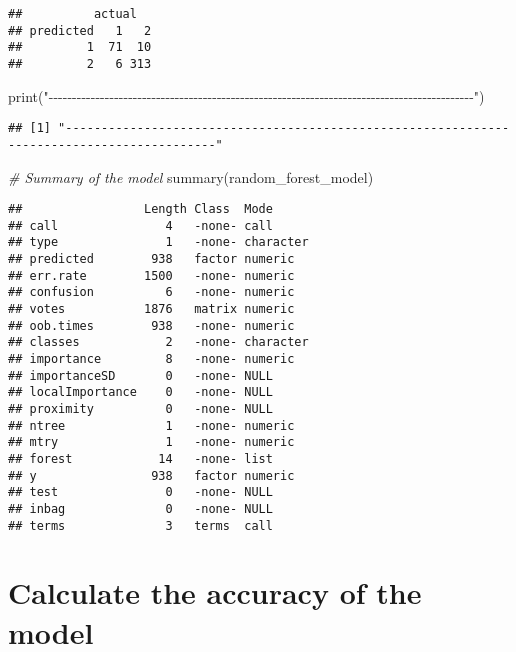 \documentclass[
]{article}
\newenvironment{Shaded}{\begin{snugshade}}{\end{snugshade}}
\newcommand{\CommentTok}[1]{\textcolor[rgb]{0.56,0.35,0.01}{\textit{#1}}}
\newcommand{\FunctionTok}[1]{\textcolor[rgb]{0.00,0.00,0.00}{#1}}
\newcommand{\NormalTok}[1]{#1}
\newcommand{\StringTok}[1]{\textcolor[rgb]{0.31,0.60,0.02}{#1}}
\begin{document}
\begin{verbatim}
##          actual
## predicted   1   2
##         1  71  10
##         2   6 313
\end{verbatim}

\begin{Shaded}
\begin{Highlighting}[]
\FunctionTok{print}\NormalTok{(}\StringTok{"{-}{-}{-}{-}{-}{-}{-}{-}{-}{-}{-}{-}{-}{-}{-}{-}{-}{-}{-}{-}{-}{-}{-}{-}{-}{-}{-}{-}{-}{-}{-}{-}{-}{-}{-}{-}{-}{-}{-}{-}{-}{-}{-}{-}{-}{-}{-}{-}{-}{-}{-}{-}{-}{-}{-}{-}{-}{-}{-}{-}{-}{-}{-}{-}{-}{-}{-}{-}{-}{-}{-}{-}{-}{-}{-}{-}{-}{-}{-}{-}{-}{-}{-}{-}{-}{-}{-}{-}{-}{-}{-}"}\NormalTok{)}
\end{Highlighting}
\end{Shaded}

\begin{verbatim}
## [1] "-------------------------------------------------------------------------------------------"
\end{verbatim}

\begin{Shaded}
\begin{Highlighting}[]
\CommentTok{\# Summary of the model}
\FunctionTok{summary}\NormalTok{(random\_forest\_model)}
\end{Highlighting}
\end{Shaded}

\begin{verbatim}
##                 Length Class  Mode     
## call               4   -none- call     
## type               1   -none- character
## predicted        938   factor numeric  
## err.rate        1500   -none- numeric  
## confusion          6   -none- numeric  
## votes           1876   matrix numeric  
## oob.times        938   -none- numeric  
## classes            2   -none- character
## importance         8   -none- numeric  
## importanceSD       0   -none- NULL     
## localImportance    0   -none- NULL     
## proximity          0   -none- NULL     
## ntree              1   -none- numeric  
## mtry               1   -none- numeric  
## forest            14   -none- list     
## y                938   factor numeric  
## test               0   -none- NULL     
## inbag              0   -none- NULL     
## terms              3   terms  call
\end{verbatim}

\hypertarget{calculate-the-accuracy-of-the-model}{%
\section{Calculate the accuracy of the
model}\label{calculate-the-accuracy-of-the-model}}
\end{document}
